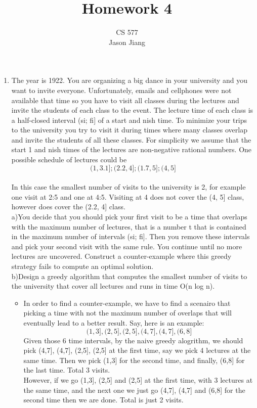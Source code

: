 \documentclass{article}
\author{CS 577\\Jason Jiang}
\title{Homework 4}
\begin{document}
    \maketitle
    \begin{enumerate}
        \item   The year is 1922. You are organizing a big dance in your university and you want to invite everyone. Unfortunately, emails and cellphones were not available that time so you have to visit all classes during the lectures and invite the students of each class to the event. The lecture time of each class is a half-closed interval (si; fi] of a start and  nish time. To minimize your trips to the university you try to visit it during times where many classes overlap and invite the students of all these classes. For simplicity we assume that the start 1 and  nish times of the lectures are non-negative rational numbers. One possible schedule of lectures could be
            \\
            $$(1, 3.1]; (2.2, 4]; (1.7, 5]; (4, 5]$$\\
            In this case the smallest number of visits to the university is 2, for example one visit at 2:5
            and one at 4:5. Visiting at 4 does not cover the (4, 5] class, however does cover the (2.2, 4]
            class.\\
            a)You decide that you should pick your first visit to be a time that overlaps with the
            maximum number of lectures, that is a number t that is contained in the maximum
            number of intervals (si; fi]. Then you remove these intervals and pick your second visit
            with the same rule. You continue until no more lectures are uncovered. Construct a
            counter-example where this greedy strategy fails to compute an optimal solution.\\
            b)Design a greedy algorithm that computes the smallest number of visits to the university
            that cover all lectures and runs in time O(n log n).\\
            \begin{itemize}
                \item
                    In order to find a counter-example, we have to find a scenairo that picking a time with not the maximum number of overlaps that will eventually lead to a better result. Say, here is an example: \\
                    $$(1,3],(2,5],(2,5],(4,7],(4,7],(6,8] $$
                    Given those 6 time intervals, by the naive greedy alogrithm, we should pick (4,7], (4,7], (2,5], (2,5] at the first time, say we pick 4 lectures at the same time. Then we pick (1,3] for the second time, and finally, (6,8] for the last time. Total 3 visits. \\
                    However, if we go (1,3], (2,5] and (2,5] at the first time, with 3 lectures at the same time, and the next one we just go (4,7], (4,7] and (6,8] for the second time then we are done. Total is just 2 visits. 


\end{itemize}
\end{enumerate}
\end{document}
